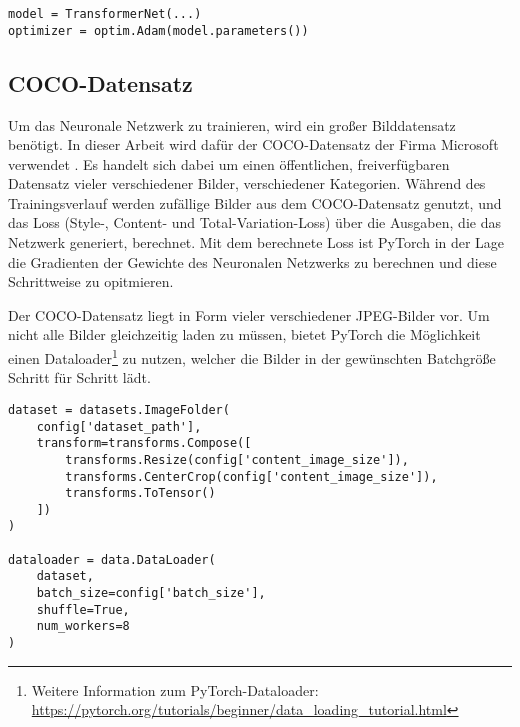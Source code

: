 \begin{listing}[H]
\begin{verbatim}
model = TransformerNet(...)
optimizer = optim.Adam(model.parameters())
\end{verbatim}
\end{listing}

\subsection{COCO-Datensatz}

Um das Neuronale Netzwerk zu trainieren, wird ein großer Bilddatensatz benötigt. In dieser Arbeit wird dafür der COCO-Datensatz der Firma Microsoft verwendet \cite{DBLP:journals/corr/LinMBHPRDZ14}. Es handelt sich dabei um einen öffentlichen, freiverfügbaren Datensatz vieler verschiedener Bilder, verschiedener Kategorien. Während des Trainingsverlauf werden zufällige Bilder aus dem COCO-Datensatz genutzt, 
und das Loss  (Style-, Content- und Total-Variation-Loss) über die Ausgaben, die das Netzwerk generiert, berechnet.
Mit dem berechnete Loss ist PyTorch in der Lage die Gradienten der Gewichte des Neuronalen Netzwerks zu berechnen und diese 
Schrittweise zu opitmieren.

Der COCO-Datensatz liegt in Form vieler verschiedener JPEG-Bilder vor. 
Um nicht alle Bilder gleichzeitig laden zu müssen, bietet PyTorch die Möglichkeit einen Dataloader\footnote{Weitere Information zum PyTorch-Dataloader: \url{https://pytorch.org/tutorials/beginner/data_loading_tutorial.html}}
zu nutzen, welcher die Bilder in der gewünschten Batchgröße Schritt für Schritt lädt.

\pagebreak

\begin{listing}[H]
\begin{verbatim}
dataset = datasets.ImageFolder(
    config['dataset_path'],
    transform=transforms.Compose([
        transforms.Resize(config['content_image_size']),
        transforms.CenterCrop(config['content_image_size']),
        transforms.ToTensor()
    ])
)

dataloader = data.DataLoader(
    dataset, 
    batch_size=config['batch_size'],
    shuffle=True, 
    num_workers=8
)
\end{verbatim}
\end{listing}

